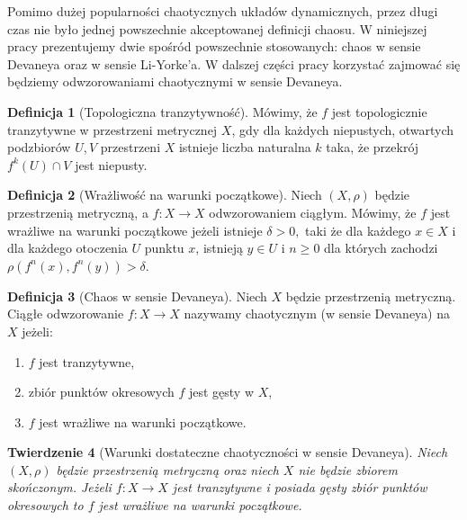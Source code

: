\documentclass[licencjacka]{pwr_wmat_praca_dyplomowa}
\theoremstyle{plain}
\newtheorem{theorem}{Twierdzenie}
\numberwithin{theorem}{chapter}
\theoremstyle{definition}
\numberwithin{theorem}{chapter}
\newtheorem{definition}[theorem]{Definicja}
\begin{document}
Pomimo dużej popularności chaotycznych układów dynamicznych, przez długi czas nie było jednej powszechnie akceptowanej definicji chaosu. W niniejszej pracy prezentujemy dwie spośród powszechnie stosowanych: chaos w sensie Devaneya oraz w sensie Li-Yorke'a. W dalszej części pracy korzystać zajmować się będziemy odwzorowaniami chaotycznymi w sensie Devaneya.

\begin{definition}[Topologiczna tranzytywność]
\cite{onDeveneyDefinitionOfChaos}
Mówimy, że $f$ jest topologicznie tranzytywne w przestrzeni metrycznej $X$, gdy dla każdych niepustych, otwartych podzbiorów $U, V$ przestrzeni $X$ istnieje liczba naturalna $k$ taka, że przekrój $f^k(U) \cap V$ jest niepusty.
\end{definition}

\begin{definition}[Wrażliwość na warunki początkowe]
\cite{balibrea2003topological}
Niech $(X, \rho)$ będzie przestrzenią metryczną, a $f: X \rightarrow X$ odwzorowaniem ciągłym.
Mówimy, że $f$ jest wrażliwe na warunki początkowe jeżeli  istnieje $\delta > 0,$ taki że dla każdego $x \in X$ i dla każdego otoczenia $U$ punktu $x$, istnieją $y \in U$ i $n \geq 0$ dla których zachodzi $\rho(f^n(x), f^n(y)) > \delta$.
\end{definition}

\begin{definition}[Chaos w sensie Devaneya]
Niech $X$ będzie przestrzenią metryczną. Ciągłe odwzorowanie $f: X \rightarrow X$ nazywamy chaotycznym (w sensie Devaneya) na $X$ jeżeli:
\begin{enumerate}
\item $f$ jest tranzytywne,
\item zbiór punktów okresowych $f$ jest gęsty w $X$,
\item $f$ jest wrażliwe na warunki początkowe.
\end{enumerate}
\end{definition}


\begin{theorem}
[Warunki dostateczne chaotyczności w sensie Devaneya]
\label{warunki_dostateczne_chaotycznosci_devaneya}
\cite{onDeveneyDefinitionOfChaos}
Niech $(X, \rho)$ będzie przestrzenią metryczną oraz niech $X$ nie będzie zbiorem skończonym.
Jeżeli $f: X \rightarrow X$ jest tranzytywne i posiada gęsty zbiór punktów okresowych to $f$ jest wrażliwe na warunki początkowe.
\end{theorem}
\end{document}
